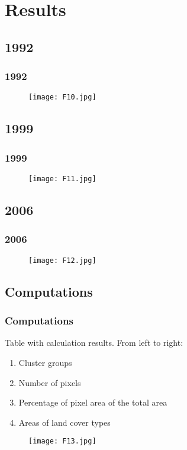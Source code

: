 \documentclass[pdflatex,compress,10pt,
	xcolor={dvipsnames,dvipsnames,svgnames,x11names,table},
	hyperref={
	breaklinks = true, 
	pdfauthor={Lemenkova Polina}, 
	pdfsubject={Preentation}, 
	pdfcreator={Lemenkova Polina}, 
	pdfproducer={Lemenkova Polina}, 
	citecolor=NavyBlue, 
	urlcolor = NavyBlue, 
	breaklinks = true}]{beamer}
\begin{document}
\section{Results}
\subsection{1992}
\begin{frame}\frametitle{1992}
\begin{figure}[H]
	\centering
		\texttt{[image: F10.jpg]}
\end{figure}
\end{frame}

\subsection{1999}
\begin{frame}\frametitle{1999}
\begin{figure}[H]
	\centering
		\texttt{[image: F11.jpg]}
\end{figure}
\end{frame}

\subsection{2006}
\begin{frame}\frametitle{2006}
\begin{figure}[H]
	\centering
		\texttt{[image: F12.jpg]}
\end{figure}
\end{frame}

\subsection{Computations}
\begin{frame}\frametitle{Computations}
Table with calculation results.  
From left to right:
\begin{enumerate}
	\item Cluster groups
	\item Number of pixels
	\item Percentage of pixel area of the total area
	\item Areas of land cover types
\end{enumerate}
\begin{figure}[H]
	\centering
		\texttt{[image: F13.jpg]}
\end{figure}
\end{frame}
\end{document}
